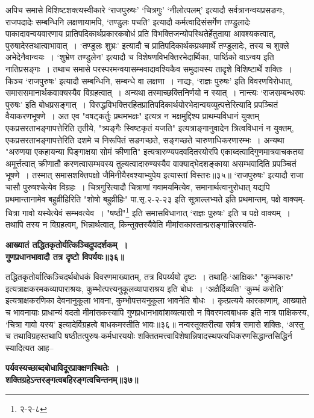 {{{{ अपिच समासे विशिष्टशक्त्यस्वीकारे `राजपुरुषः' `चित्रगुः' `नीलोत्पलम्' इत्यादौ सर्वत्रानन्वयप्रसङगः, राजपदादेः सम्बन्धिनि लक्षणायामपि, `तण्डुलः पचति' इत्यादौ कर्मत्वादिसंसर्गेण तण्डुलादेः पाकादावन्वयवारणाय प्रातिपदिकार्थप्रकारकबोधं प्रति विभक्तिजन्योपस्थितेर्हेतुताया आवश्यकत्वात्, पुरुषादेस्तथात्वाभावात्~।
`तण्डुलः शुभ्रः' इत्यादौ च प्रातिपदिकार्थकप्रथमार्थे तण्डुलादेः, तस्य च शुक्ले अभेदेनैवान्वयः~।
 `शुभ्रेण तण्डुलेन' इत्यादौ च विशेषणविभक्तिरभेदार्थिका, पार्ष्ठिको वाऽन्वय इति नातिप्रसङ्गः~।
तथाच समासे परस्परमन्वयासम्भवादावश्यिकैव समुदायस्य तादृशे विशिष्टार्थे शक्तिः~।
 किञ्च `राजपुरुषः' इत्यादौ सम्बन्धिनि, सम्बन्धे वा लक्षणा~।
नाद्यः, `राज्ञः पुरुषः' इति विवरणविरोधात्, समाससमानार्थकवाक्यस्यैव विग्रहत्वात्~।
अन्यथा तस्माच्छक्तिनिर्णयो न स्यात्~।
नान्त्यः `राजसम्बन्धरुपः पुरुषः' इति बोधप्रसङ्गात्~।
विरुद्धविभक्तिरहितप्रातिपदिकार्थयोरभेदान्वयव्युत्पत्तेरित्यादि प्रपञ्चितं वैयाकरणभूषणे~।
 अत एव "वषट्कर्तुः प्रथमभक्षः" इत्यत्र न भक्षमुद्दिश्य प्राथम्यविधानं युक्तम् एकप्रसरताभङ्गापत्तेरिति तृतीये, "त्र्यङ्गैः स्विष्टकृतं यजति" इत्यत्राङ्गानुवादेन त्रित्वविधानं न युक्तम्, एकप्रसरताभङ्गापत्तेरिति दशमे च निरूपितं सङगच्छते, सङ्गच्छते चारुणाधिकरणारम्भः~।
 अन्यथा "अरुणया एकहायन्या पिङ्गाक्षया सोमं क्रीणाति" इत्यत्रारुण्यपदवदितरयोरपि एकाब्दत्वादिगुणमात्रवाचकतया अमूर्त्तत्वात् क्रीणातौ करणत्वासम्भवस्य तुल्यत्वादारुण्यस्यैव वाक्याद्भेदशङ्काया असम्भवादिति प्रपञ्चितं भूषणे~।
तस्मात् समासशक्तिपक्षो जैमिनीयैरवश्याभ्युपेय इत्यास्तां विस्तरः॥३५॥
 `राजपुरुषः' इत्यादौ राजा चासौ पुरुषश्चेत्येव विग्रहः~।
चित्रगुरित्यादौ चित्राणां गवामयमित्येव, समानार्थत्वानुरोधात् यद्यपि प्रथमान्तानामेव बहुव्रीहिरिति "शोषो बहुव्रीहिः" {पा.सृ.२-२-२३} इति सूत्राल्लभ्यते इति प्रथमान्तम्, पक्षे वाक्यम्-चित्रा गावो यस्येत्येवं सम्भवत्येव~।
"षष्ठी"\footnote{२-२-८} इति समासविधानात् `राज्ञः पुरुषः' इति च पक्षे वाक्यम्~।
तथापि तस्य न विग्रहत्वम्, भिन्नार्थत्वात्, किन्तूक्तस्यैवेति मीमांसकास्तान्प्रसङ्गान्निरस्यति-
\begin{center}{\bfseries आख्यातं तद्धितकृतोर्यत्किञ्चिदुपदर्शकम्~।\\
 गुणप्रधानभावादौ तत्र दृष्टो विपर्ययः॥३६॥}\end{center}
 तद्धितकृतोर्यात्किञ्चिदर्थबोधकं विवरणमाख्यातम्, तत्र विपर्य्ययो दृष्टः~।
तथाहि-`आक्षिकः" "कुम्भकारः" इत्यत्राक्षकरमकव्यापाराश्रयः, कुम्भोत्पत्त्यनुकूलव्यापाराश्रय इति बोधः~।
`अक्षैर्दिव्यति' `कुम्भं करोति' इत्यत्राक्षकरणिका देवनानुकूला भावना, कुम्भोपत्तयनुकूला भावनेति बोधः~।
कृत्प्रत्यये कारकाणाम्, आख्याते च भावनायाः प्राधान्यं वदतो मीमांसकस्यापि गुणप्रधानभावांशव्यत्यासो न विवरणत्वबाधक इति नात्र पाक्षिकस्य, `चित्रा गावो यस्य' इत्यादेर्विग्रहत्वे बाधकमस्तीति भावः॥३६॥
 नन्वस्तूक्तरीत्या सर्वत्र समासे शक्तिः, `अस्तु च तथाविग्रहस्तथापि षष्ठीतत्पुरुष-कर्मधारययोः शक्तितमत्त्वाविशेषान्निषादस्थपत्यधिकरणसिद्धान्तसिद्धिर्न स्यादित्यत आह--
\begin{center}{\bfseries पर्यवस्यच्छाब्दबोधाविदूरप्राक्क्षणस्थितेः~।\\
 शक्तिग्रहेऽन्तरङ्गत्वबहिरङ्गत्वचिन्तनम्॥३७॥}\end{center}

}}}}
